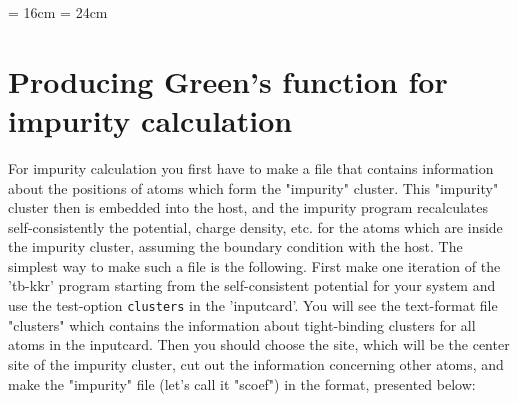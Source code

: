 

\textwidth = 16cm
\textheight= 24cm

\hoffset=-0.8cm
\voffset=-2.0cm



\section{Producing Green's function for impurity calculation}

For impurity calculation you first have to make a file that 
contains information about the positions of atoms which form
the "impurity" cluster. This "impurity" cluster then 
is embedded into the host, and the impurity program recalculates
self-consistently the potential, charge density, etc.  
for the atoms which are inside the impurity cluster, 
assuming the boundary condition with the host. The simplest way 
to make such a file is the following. First make one iteration 
of the 'tb-kkr' program starting from the self-consistent potential for your 
system and use the test-option {\tt clusters} in the 'inputcard'.
You will see the text-format file "clusters" which contains the information 
about tight-binding clusters for all atoms in the inputcard. 
Then you should choose the site, which will be the center site of the impurity 
cluster, cut out the information concerning other atoms, and make the 
"impurity" file (let's call it "scoef") in the format, presented below: 
\bigskip

